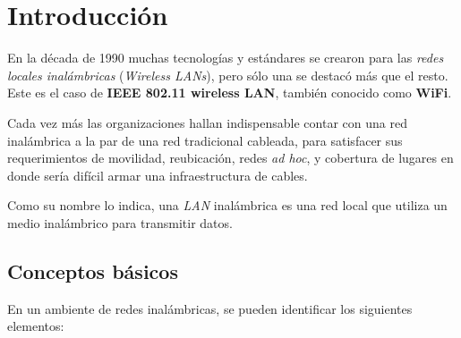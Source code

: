 





\tableofcontents
\clearpage 

\section{Introducción}

En la década de 1990 muchas tecnologías y estándares se crearon para las \emph{redes locales inalámbricas} (\emph{Wireless LANs}), pero sólo una se destacó más que el resto. Este es el caso de \textbf{IEEE 802.11 wireless LAN}, también conocido como \textbf{WiFi}.  

Cada vez más las organizaciones hallan indispensable contar con una red inalámbrica a la par de una red tradicional cableada, para satisfacer sus requerimientos de movilidad, reubicación, redes \emph{ad hoc}, y cobertura de lugares en donde sería difícil armar una infraestructura de cables.

Como su nombre lo indica, una \emph{LAN} inalámbrica es una red local que utiliza un medio inalámbrico para transmitir datos. 

\subsection{Conceptos básicos}

En un ambiente de redes inalámbricas, se pueden identificar los siguientes elementos:

